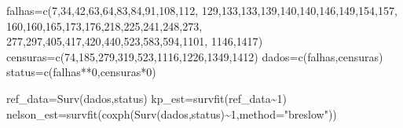 \documentclass[
]{article}
\newenvironment{Shaded}{\begin{snugshade}}{\end{snugshade}}
\newcommand{\AttributeTok}[1]{\textcolor[rgb]{0.77,0.63,0.00}{#1}}
\newcommand{\DecValTok}[1]{\textcolor[rgb]{0.00,0.00,0.81}{#1}}
\newcommand{\FunctionTok}[1]{\textcolor[rgb]{0.00,0.00,0.00}{#1}}
\newcommand{\NormalTok}[1]{#1}
\newcommand{\OtherTok}[1]{\textcolor[rgb]{0.56,0.35,0.01}{#1}}
\newcommand{\SpecialCharTok}[1]{\textcolor[rgb]{0.00,0.00,0.00}{#1}}
\newcommand{\StringTok}[1]{\textcolor[rgb]{0.31,0.60,0.02}{#1}}
\begin{document}
\begin{Shaded}
\begin{Highlighting}[]
\NormalTok{falhas}\OtherTok{=}\FunctionTok{c}\NormalTok{(}\DecValTok{7}\NormalTok{,}\DecValTok{34}\NormalTok{,}\DecValTok{42}\NormalTok{,}\DecValTok{63}\NormalTok{,}\DecValTok{64}\NormalTok{,}\DecValTok{83}\NormalTok{,}\DecValTok{84}\NormalTok{,}\DecValTok{91}\NormalTok{,}\DecValTok{108}\NormalTok{,}\DecValTok{112}\NormalTok{,}
         \DecValTok{129}\NormalTok{,}\DecValTok{133}\NormalTok{,}\DecValTok{133}\NormalTok{,}\DecValTok{139}\NormalTok{,}\DecValTok{140}\NormalTok{,}\DecValTok{140}\NormalTok{,}\DecValTok{146}\NormalTok{,}\DecValTok{149}\NormalTok{,}\DecValTok{154}\NormalTok{,}\DecValTok{157}\NormalTok{,}
         \DecValTok{160}\NormalTok{,}\DecValTok{160}\NormalTok{,}\DecValTok{165}\NormalTok{,}\DecValTok{173}\NormalTok{,}\DecValTok{176}\NormalTok{,}\DecValTok{218}\NormalTok{,}\DecValTok{225}\NormalTok{,}\DecValTok{241}\NormalTok{,}\DecValTok{248}\NormalTok{,}\DecValTok{273}\NormalTok{,}
         \DecValTok{277}\NormalTok{,}\DecValTok{297}\NormalTok{,}\DecValTok{405}\NormalTok{,}\DecValTok{417}\NormalTok{,}\DecValTok{420}\NormalTok{,}\DecValTok{440}\NormalTok{,}\DecValTok{523}\NormalTok{,}\DecValTok{583}\NormalTok{,}\DecValTok{594}\NormalTok{,}\DecValTok{1101}\NormalTok{,}
         \DecValTok{1146}\NormalTok{,}\DecValTok{1417}\NormalTok{)}
\NormalTok{censuras}\OtherTok{=}\FunctionTok{c}\NormalTok{(}\DecValTok{74}\NormalTok{,}\DecValTok{185}\NormalTok{,}\DecValTok{279}\NormalTok{,}\DecValTok{319}\NormalTok{,}\DecValTok{523}\NormalTok{,}\DecValTok{1116}\NormalTok{,}\DecValTok{1226}\NormalTok{,}\DecValTok{1349}\NormalTok{,}\DecValTok{1412}\NormalTok{)}
\NormalTok{dados}\OtherTok{=}\FunctionTok{c}\NormalTok{(falhas,censuras)}
\NormalTok{status}\OtherTok{=}\FunctionTok{c}\NormalTok{(falhas}\SpecialCharTok{**}\DecValTok{0}\NormalTok{,censuras}\SpecialCharTok{*}\DecValTok{0}\NormalTok{)}

\NormalTok{ref\_data}\OtherTok{=}\FunctionTok{Surv}\NormalTok{(dados,status)}
\NormalTok{kp\_est}\OtherTok{=}\FunctionTok{survfit}\NormalTok{(ref\_data}\SpecialCharTok{\textasciitilde{}}\DecValTok{1}\NormalTok{)}
\NormalTok{nelson\_est}\OtherTok{=}\FunctionTok{survfit}\NormalTok{(}\FunctionTok{coxph}\NormalTok{(}\FunctionTok{Surv}\NormalTok{(dados,status)}\SpecialCharTok{\textasciitilde{}}\DecValTok{1}\NormalTok{,}\AttributeTok{method=}\StringTok{"breslow"}\NormalTok{))}


\end{Highlighting}
\end{Shaded}
\end{document}

